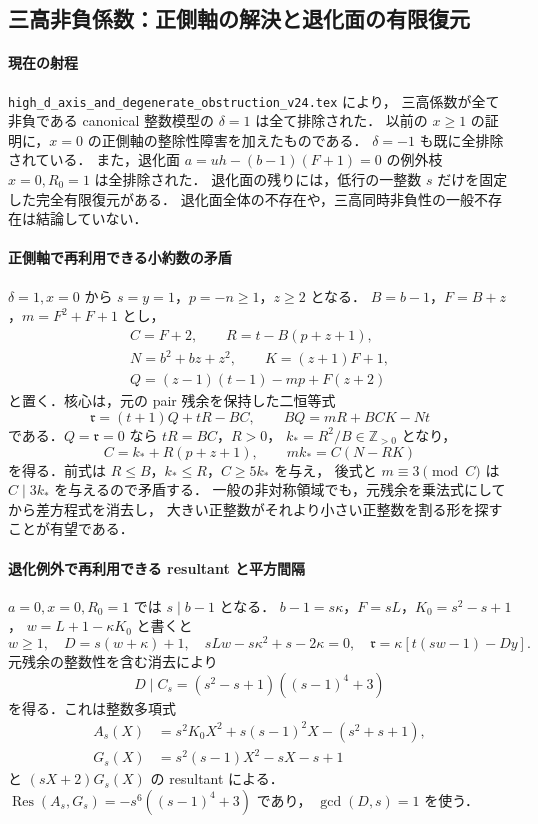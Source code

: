 \subsection{三高非負係数：正側軸の解決と退化面の有限復元}
\label{notes:ax24}

\paragraph{現在の射程}

\nolinkurl{high_d_axis_and_degenerate_obstruction_v24.tex} により，
三高係数が全て非負である canonical 整数模型の $\delta=1$ は全て排除された．
以前の $x\ge1$ の証明に，$x=0$ の正側軸の整除性障害を加えたものである．
$\delta=-1$ も既に全排除されている．
また，退化面 $a=uh-(b-1)(F+1)=0$ の例外枝 $x=0,R_0=1$ は全排除された．
退化面の残りには，低行の一整数 $s$ だけを固定した完全有限復元がある．
退化面全体の不存在や，三高同時非負性の一般不存在は結論していない．

\paragraph{正側軸で再利用できる小約数の矛盾}

$\delta=1,x=0$ から $s=y=1$，$p=-n\ge1$，$z\ge2$ となる．
$B=b-1$，$F=B+z$，$m=F^2+F+1$ とし，
\[
 \begin{gathered}
 C=F+2,\qquad R=t-B(p+z+1),\\
 N=b^2+bz+z^2,\qquad K=(z+1)F+1,\\
 Q=(z-1)(t-1)-mp+F(z+2)
 \end{gathered}
\]
と置く．核心は，元の pair 残余を保持した二恒等式
\[
 \mathfrak r=(t+1)Q+tR-BC,\qquad BQ=mR+BCK-Nt
\]
である．$Q=\mathfrak r=0$ なら $tR=BC$，$R>0$，
$k_*=R^2/B\in\mathbb Z_{>0}$ となり，
\[
 C=k_*+R(p+z+1),\qquad mk_*=C(N-RK)
\]
を得る．前式は $R\le B$，$k_*\le R$，$C\ge5k_*$ を与え，
後式と $m\equiv3\pmod C$ は $C\mid3k_*$ を与えるので矛盾する．
一般の非対称領域でも，元残余を乗法式にしてから差方程式を消去し，
大きい正整数がそれより小さい正整数を割る形を探すことが有望である．

\paragraph{退化例外で再利用できる resultant と平方間隔}

$a=0,x=0,R_0=1$ では $s\mid b-1$ となる．
$b-1=s\kappa$，$F=sL$，$K_0=s^2-s+1$，
$w=L+1-\kappa K_0$ と書くと
\[
 w\ge1,\quad D=s(w+\kappa)+1,\quad
 sLw-s\kappa^2+s-2\kappa=0,
 \quad \mathfrak r=\kappa[t(sw-1)-Dy].
\]
元残余の整数性を含む消去により
\[
 D\mid C_s=(s^2-s+1)((s-1)^4+3)
\]
を得る．これは整数多項式
\[
 \begin{aligned}
 A_s(X)&=s^2K_0X^2+s(s-1)^2X-(s^2+s+1),\\
 G_s(X)&=s^2(s-1)X^2-sX-s+1
 \end{aligned}
\]
と $(sX+2)G_s(X)$ の resultant による．
$\operatorname{Res}(A_s,G_s)=-s^6((s-1)^4+3)$ であり，
$\gcd(D,s)=1$ を使う．

